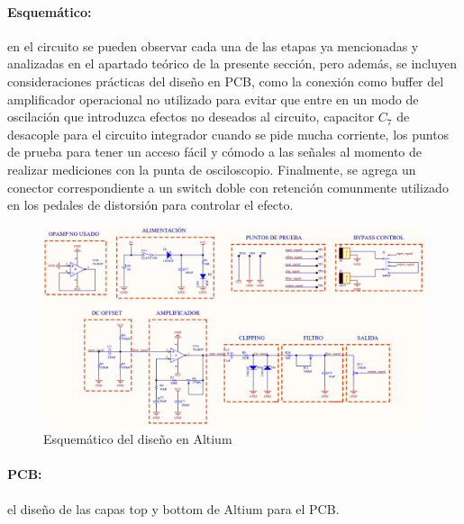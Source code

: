 \paragraph*{Esquem\'atico:} en el circuito se pueden observar cada una de las etapas ya mencionadas y analizadas en el apartado te\'orico de la presente secci\'on,
pero adem\'as, se incluyen consideraciones pr\'acticas del dise\~no en PCB, como la conexi\'on como buffer del amplificador operacional no utilizado para evitar que entre
en un modo de oscilaci\'on que introduzca efectos no deseados al circuito, capacitor $C_7$ de desacople para el circuito integrador cuando se pide mucha corriente, los puntos de prueba para tener
un acceso f\'acil y c\'omodo a las se\~nales al momento de realizar mediciones con la punta de osciloscopio. Finalmente, se agrega un conector correspondiente a un switch doble con retenci\'on comunmente
utilizado en los pedales de distorsi\'on para controlar el efecto.

\begin{figure}[H]
    \centering
    \includegraphics[scale=0.55]{../EJ5/Recursos/esquematico.PNG}
    \caption{Esquem\'atico del dise\~no en Altium}
    \label{fig:pedal_esquematico}
\end{figure}

\paragraph*{PCB:} el dise\~no de las capas top y bottom de Altium para el PCB.

